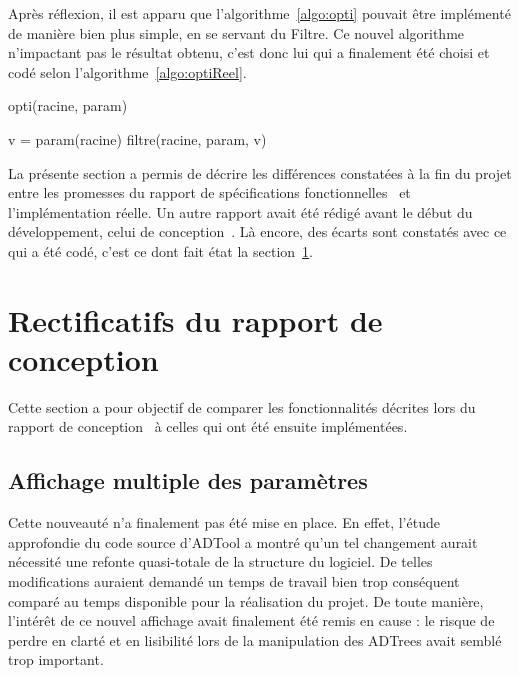 Après réflexion, 
il est apparu que l'{\sc algorithme}~\ref{algo:opti} pouvait être implémenté de manière bien plus simple, en se servant du Filtre. Ce nouvel algorithme n'impactant pas le résultat obtenu, c'est donc lui qui a finalement été choisi et codé selon l'{\sc algorithme}~\ref{algo:optiReel}.

	\begin{algorithm}[H]
            \caption{opti(racine, param)}
            \label{algo:optiReel}
            \begin{algorithmic}
		\STATE v = param(racine)
		\STATE filtre(racine, param, v)
            \end{algorithmic}
        \end{algorithm}

    La présente section a permis de décrire les différences constatées à la fin du projet entre les promesses du rapport de spécifications fonctionnelles~\cite{spec_fonc} et l'implémentation réelle. Un autre rapport avait été rédigé avant le début du développement, celui de conception~\cite{conception}. Là encore, des écarts sont constatés avec ce qui a été codé, c'est ce dont fait état la {\sc section}~\ref{sec:rectConc}. 

\newpage
\section{Rectificatifs du rapport de conception}
\label{sec:rectConc}
    
    Cette section a pour objectif de comparer les fonctionnalités décrites lors du rapport de conception~\cite{conception} à celles qui ont été ensuite implémentées.

	\subsection{Affichage multiple des paramètres}

    Cette nouveauté n'a finalement pas été mise en place. En effet, l'étude approfondie du code source d'ADTool a montré qu'un tel changement aurait nécessité une refonte quasi-totale de la structure du logiciel. De telles modifications auraient demandé un temps de travail bien trop conséquent comparé au temps disponible pour la réalisation du projet. De toute manière, l'intérêt de ce nouvel affichage avait finalement été remis en cause : le risque de perdre en clarté et en lisibilité lors de la manipulation des ADTrees avait semblé trop important.


